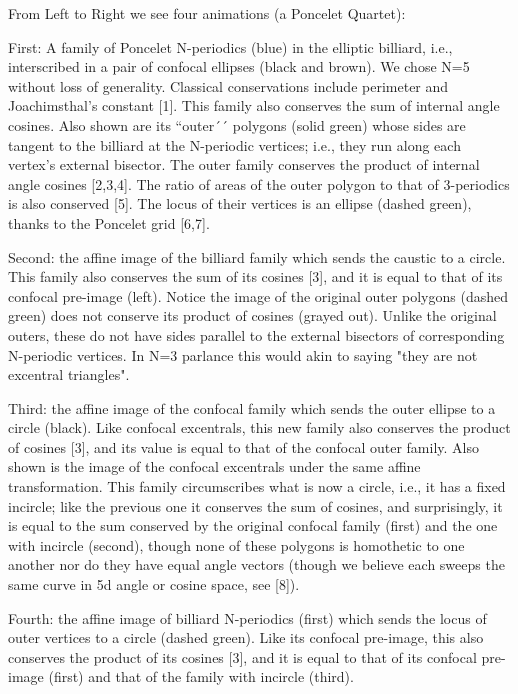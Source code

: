 From Left to Right we see four animations (a Poncelet Quartet):

First: A family of Poncelet N-periodics (blue) in the elliptic billiard, i.e., interscribed in a pair of confocal ellipses (black and brown). We chose N=5 without loss of generality. Classical conservations include perimeter and Joachimsthal's constant [1]. This family also conserves the sum of internal angle cosines. Also shown are its ``outer´´ polygons (solid green) whose sides are tangent to the billiard at the N-periodic vertices; i.e., they run along each vertex's external bisector. The outer family conserves the product of internal angle cosines [2,3,4]. The ratio of areas of the outer polygon to that of 3-periodics is also conserved [5]. The locus of their vertices is an ellipse (dashed green), thanks to the Poncelet grid [6,7]. 

Second: the affine image of the billiard family which sends the caustic to a circle. This family also conserves the sum of its cosines [3], and it is equal to that of its confocal pre-image (left). Notice the image of the original outer polygons (dashed green) does not conserve its product of cosines (grayed out). Unlike the original outers, these do not have sides parallel to the external bisectors of corresponding N-periodic vertices. In N=3 parlance this would akin to saying "they are not excentral triangles".

Third: the affine image of the confocal family which sends the outer ellipse to a circle (black). Like confocal excentrals, this new family also conserves the product of cosines [3], and its value is equal to that of the confocal outer family. Also shown is the image of the confocal excentrals under the same affine transformation. This family circumscribes what is now a circle, i.e., it has a fixed incircle; like the previous one it conserves the sum of cosines, and surprisingly, it is equal to the sum conserved by the original confocal family (first) and the one with incircle (second), though none of these polygons is homothetic to one another nor do they have equal angle vectors (though we believe each sweeps the same curve in 5d angle or cosine space, see [8]).

Fourth: the affine image of billiard N-periodics (first) which sends the locus of outer vertices to a circle (dashed green). Like its confocal pre-image, this also conserves the product of its cosines [3], and it is equal to that of its confocal pre-image (first) and that of the family with incircle (third). 

